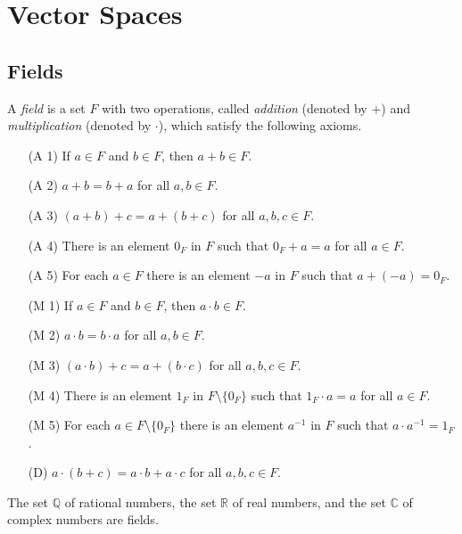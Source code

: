 \chapter{Vector Spaces}
\section{Fields}
\begin{definition}
  \label{def:field}
  A \emph{field} is a set $F$ with two operations, called \emph{addition}
  (denoted by $+$) and \emph{multiplication} (denoted by $\cdot$), which
  satisfy the following axioms.
  \begin{enumerate}[leftmargin=3.5em]
    \item[(A 1)] If $a \in F$ and $b \in F$, then $a + b \in F$.
    \item[(A 2)] $a + b = b + a$ for all $a, b \in F$.
    \item[(A 3)] $(a + b) + c = a + (b + c)$ for all $a, b, c \in F$.
    \item[(A 4)] There is an element $0_F$ in $F$ such that $0_F + a = a$ for
      all $a \in F$. 
    \item[(A 5)] For each $a \in F$ there is an element $-a$ in $F$ such that
      $a + (-a) = 0_F$.
    \item[(M 1)] If $a \in F$ and $b \in F$, then $a \cdot b \in F$.
    \item[(M 2)] $a \cdot b = b \cdot a$ for all $a, b \in F$.
    \item[(M 3)] $(a \cdot b) + c = a + (b \cdot c)$ for all $a, b, c \in F$.
    \item[(M 4)] There is an element $1_F$ in $F \setminus \{0_F\}$ such that
      $1_F \cdot a = a$ for all $a \in F$.
    \item[(M 5)] For each $a \in F \setminus \{0_F\}$ there is an element
      $a^{-1}$ in $F$ such that $a \cdot a^{-1} = 1_F$.
    \item[(D)] $a \cdot (b + c) = a \cdot b + a \cdot c$ for all
      $a, b, c \in F$.
  \end{enumerate}
\end{definition}

\begin{example}
  The set $\mathbb{Q}$ of rational numbers, the set $\mathbb{R}$ of real
  numbers, and the set $\mathbb{C}$ of complex numbers are fields.
\end{example}

